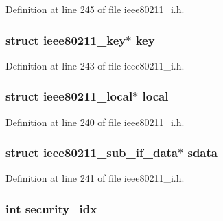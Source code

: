 Definition at line 245 of file ieee80211\-\_\-i.\-h.

\hypertarget{structieee80211__rx__data_a6fb9dce4966e6727c301a63b8185c388}{
\subsubsection[{key}]{\setlength{\rightskip}{0pt plus 5cm}struct {\bf ieee80211\-\_\-key}$\ast$ key}}\label{structieee80211__rx__data_a6fb9dce4966e6727c301a63b8185c388}


Definition at line 243 of file ieee80211\-\_\-i.\-h.

\hypertarget{structieee80211__rx__data_ad436a024f420f219c4fe2eebce7e4ab2}{
\subsubsection[{local}]{\setlength{\rightskip}{0pt plus 5cm}struct {\bf ieee80211\-\_\-local}$\ast$ local}}\label{structieee80211__rx__data_ad436a024f420f219c4fe2eebce7e4ab2}


Definition at line 240 of file ieee80211\-\_\-i.\-h.

\hypertarget{structieee80211__rx__data_ad829d8d33f06a7245cc303f924f259ac}{
\subsubsection[{sdata}]{\setlength{\rightskip}{0pt plus 5cm}struct {\bf ieee80211\-\_\-sub\-\_\-if\-\_\-data}$\ast$ sdata}}\label{structieee80211__rx__data_ad829d8d33f06a7245cc303f924f259ac}


Definition at line 241 of file ieee80211\-\_\-i.\-h.

\hypertarget{structieee80211__rx__data_ae61977ea897e469c291f27e7e5b09d19}{
\subsubsection[{security\-\_\-idx}]{\setlength{\rightskip}{0pt plus 5cm}int security\-\_\-idx}}\label{structieee80211__rx__data_ae61977ea897e469c291f27e7e5b09d19}


